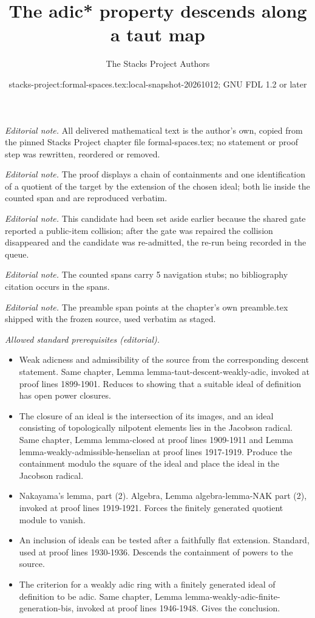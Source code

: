 \documentclass{stacks-project}
\title{The adic* property descends along a taut map}
\author{The Stacks Project Authors}
\date{stacks-project:formal-spaces.tex:local-snapshot-20261012; GNU FDL 1.2 or later}
\theoremstyle{plain}
\theoremstyle{definition}
\theoremstyle{remark}
\numberwithin{equation}{subsection}
\begin{document}
\maketitle
\noindent\textit{Editorial note.} All delivered mathematical text is the author's own, copied from the pinned Stacks Project chapter file formal-spaces.tex; no statement or proof step was rewritten, reordered or removed.\par\medskip
\noindent\textit{Editorial note.} The proof displays a chain of containments and one identification of a quotient of the target by the extension of the chosen ideal; both lie inside the counted span and are reproduced verbatim.\par\medskip
\noindent\textit{Editorial note.} This candidate had been set aside earlier because the shared gate reported a public-item collision; after the gate was repaired the collision disappeared and the candidate was re-admitted, the re-run being recorded in the queue.\par\medskip
\noindent\textit{Editorial note.} The counted spans carry 5 navigation stubs; no bibliography citation occurs in the spans.\par\medskip
\noindent\textit{Editorial note.} The preamble span points at the chapter's own preamble.tex shipped with the frozen source, used verbatim as staged.\par\medskip
\noindent\textit{Allowed standard prerequisites (editorial).}\begin{itemize}
\item Weak adicness and admissibility of the source from the corresponding descent statement. Same chapter, Lemma lemma-taut-descent-weakly-adic, invoked at proof lines 1899-1901. Reduces to showing that a suitable ideal of definition has open power closures.
\item The closure of an ideal is the intersection of its images, and an ideal consisting of topologically nilpotent elements lies in the Jacobson radical. Same chapter, Lemma lemma-closed at proof lines 1909-1911 and Lemma lemma-weakly-admissible-henselian at proof lines 1917-1919. Produce the containment modulo the square of the ideal and place the ideal in the Jacobson radical.
\item Nakayama's lemma, part (2). Algebra, Lemma algebra-lemma-NAK part (2), invoked at proof lines 1919-1921. Forces the finitely generated quotient module to vanish.
\item An inclusion of ideals can be tested after a faithfully flat extension. Standard, used at proof lines 1930-1936. Descends the containment of powers to the source.
\item The criterion for a weakly adic ring with a finitely generated ideal of definition to be adic. Same chapter, Lemma lemma-weakly-adic-finite-generation-bis, invoked at proof lines 1946-1948. Gives the conclusion.
\end{itemize}\medskip
\end{document}
